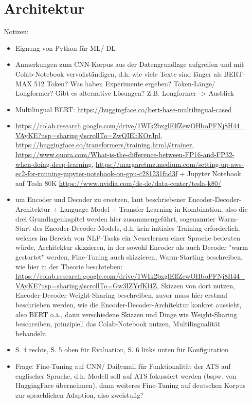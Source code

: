 \section{Architektur}
Notizen:
\begin{itemize}
	\item Eignung von Python für ML/ DL
	\item Anmerkungen zum CNN-Korpus aus der Datengrundlage aufgreifen und mit Colab-Notebook vervollständigen, d.h. wie viele Texte sind länger als BERT-MAX 512 Token? Was 	haben Experimente ergeben? Token-Länge/ Longformer? Gibt es alternative Lösungen? Z.B. Longformer -> Ausblick
	\item Multilingual BERT: \url{https://huggingface.co/bert-base-multilingual-cased}
	\item \url{https://colab.research.google.com/drive/1WIk2bxglElfZewOHboPFNj8H44_VAyKE?usp=sharing#scrollTo=ZwQIEhKOrJpl}, \url{https://huggingface.co/transformers/training.html#trainer}, \url{https://www.quora.com/What-is-the-difference-between-FP16-and-FP32-when-doing-deep-learning}, \url{https://margaretmz.medium.com/setting-up-aws-ec2-for-running-jupyter-notebook-on-gpu-c281231fad3f} + Jupyter Notebook auf Tesla 80K \url{https://www.nvidia.com/de-de/data-center/tesla-k80/}
	\item \cite{ROT20} um Encoder und Decoder zu ersetzen, laut beschriebener Encoder-Decoder-Architektur + Language Model + Transfer Learning in Kombination, also die drei Grundlagenkapitel werden hier zusammengeführt, sogenannter Warm-Start des Encoder-Decoder-Models, d.h. kein initiales Training erforderlich, welches im Bereich von NLP-Tasks ein Neuerlernen einer Sprache bedeuten würde, Architektur skizzieren, in der sowohl Encoder als auch Decoder "warm gestartet" werden, Fine-Tuning auch skizzieren, Warm-Starting beschreiben, wie hier in der Theorie beschrieben: \url{https://colab.research.google.com/drive/1WIk2bxglElfZewOHboPFNj8H44_VAyKE?usp=sharing#scrollTo=Gw3IZYrfKl4Z}, Skizzen von dort nutzen, Encoder-Decoder-Weight-Sharing beschreiben, zuvor muss hier erstmal beschrieben werden, wie die Encoder-Decoder-Architektur konkret aussieht, also BERT o.ä., dann verschiedene Skizzen und Dinge wie Weight-Sharing beschreiben, prinzipiell das Colab-Notebook nutzen, Multilingualität behandeln
	\item \cite{YAN19} S. 4 rechts, S. 5 oben für Evaluation, S. 6 links unten für Konfiguration
	\item Frage: Fine-Tuning auf CNN/ Dailymail für Funktionalität der ATS auf englischer Sprache, d.h. Modell soll auf ATS fokussiert werden (bspw. von HuggingFace übernehmen), dann weiteres Fine-Tuning auf deutschen Korpus zur sprachlichen Adaption, also zweistufig?

\end{itemize}
